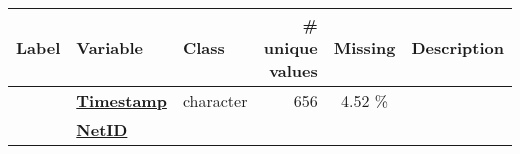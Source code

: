 \documentclass[]{article}
\begin{document}
\begin{longtable}[]{@{}lllrcl@{}}
\toprule
\begin{minipage}[b]{0.07\columnwidth}\raggedright\strut
Label\strut
\end{minipage} & \begin{minipage}[b]{0.35\columnwidth}\raggedright\strut
Variable\strut
\end{minipage} & \begin{minipage}[b]{0.11\columnwidth}\raggedright\strut
Class\strut
\end{minipage} & \begin{minipage}[b]{0.10\columnwidth}\raggedleft\strut
\# unique values\strut
\end{minipage} & \begin{minipage}[b]{0.10\columnwidth}\centering\strut
Missing\strut
\end{minipage} & \begin{minipage}[b]{0.12\columnwidth}\raggedright\strut
Description\strut
\end{minipage}\tabularnewline
\midrule
\endhead
\begin{minipage}[t]{0.07\columnwidth}\raggedright\strut
\strut
\end{minipage} & \begin{minipage}[t]{0.35\columnwidth}\raggedright\strut
\textbf{\protect\hyperlink{timestamp}{Timestamp}}\strut
\end{minipage} & \begin{minipage}[t]{0.11\columnwidth}\raggedright\strut
character\strut
\end{minipage} & \begin{minipage}[t]{0.10\columnwidth}\raggedleft\strut
656\strut
\end{minipage} & \begin{minipage}[t]{0.10\columnwidth}\centering\strut
4.52 \%\strut
\end{minipage} & \begin{minipage}[t]{0.12\columnwidth}\raggedright\strut
\strut
\end{minipage}\tabularnewline
\begin{minipage}[t]{0.07\columnwidth}\raggedright\strut
\strut
\end{minipage} & \begin{minipage}[t]{0.35\columnwidth}\raggedright\strut
\textbf{\protect\hyperlink{netid}{NetID}}\strut
\end{minipage} & \begin{minipage}[t]{0.11\columnwidth}\raggedright\strut

\end{minipage}
\end{longtable}
\end{document}
